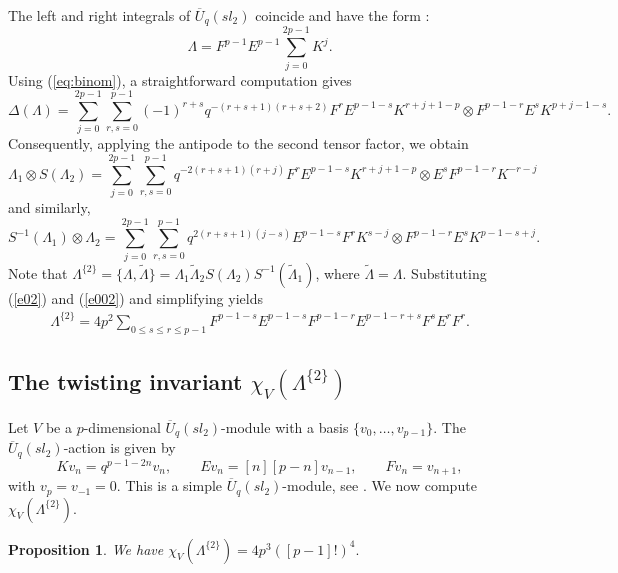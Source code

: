 \documentclass[11pt]{amsart}
\newtheorem{prop}[thm]{Proposition}
\numberwithin{equation}{section}
\begin{document}
The left and right integrals of $\overline{U}_q(sl_2)$ coincide and have the form \cite[Eq.(3.2)]{FGST}: $$\Lambda=F^{p-1}E^{p-1}\sum_{j=0}^{2p-1}K^{j}.$$
Using (\ref{eq:binom}),  a straightforward computation gives
\begin{equation}\Delta(\Lambda)=\sum_{j=0}^{2p-1}\sum_{r,s=0}^{p-1}(-1)^{r+s}q^{-(r+s+1)(r+s+2)}F^{r}E^{p-1-s}K^{r+j+1-p}\otimes F^{p-1-r}E^{s}K^{p+j-1-s}.\end{equation}
Consequently, applying the antipode to the second tensor factor, we obtain
\begin{equation}\label{e02}\Lambda_1\otimes S(\Lambda_2)=\sum_{j=0}^{2p-1}\sum_{r,s=0}^{p-1}q^{-2(r+s+1)(r+j)}F^{r}E^{p-1-s}K^{r+j+1-p}\otimes E^sF^{p-1-r}K^{-r-j}\end{equation}
and similarly,
\begin{equation}\label{e002}S^{-1}(\Lambda_1)\otimes \Lambda_2=\sum_{j=0}^{2p-1}\sum_{r,s=0}^{p-1}q^{2(r+s+1)(j-s)}E^{p-1-s}F^rK^{s-j}\otimes F^{p-1-r}E^sK^{p-1-s+j}.\end{equation}
Note that $\Lambda^{\{2\}}=\{\Lambda,\widetilde{\Lambda}\}=\Lambda_1\widetilde{\Lambda}_2S(\Lambda_2)S^{-1}(\widetilde{\Lambda}_1)$, where $\widetilde{\Lambda}=\Lambda$.
Substituting (\ref{e02}) and (\ref{e002}) and simplifying yields
\begin{align}\label{e6}
\Lambda^{\{2\}}=4p^2\sum_{0\leq s\leq r \leq p-1}F^{p-1-s}E^{p-1-s}F^{p-1-r}E^{p-1-r+s}F^sE^rF^r.
\end{align}

\subsection{The twisting invariant $\chi_V(\Lambda^{\{2\}})$}
Let $V$ be a $p$-dimensional $\overline{U}_q(sl_2)$-module with a basis $\{v_0,\dots,v_{p-1}\}$. The $\overline{U}_q(sl_2)$-action is given by
\[
K v_n = q^{p-1-2n} v_n,\qquad
E v_n = [n][p-n] v_{n-1},\qquad
F v_n = v_{n+1},
\]
with $v_p=v_{-1}=0$.  This is a simple $\overline{U}_q(sl_2)$-module, see \cite[Sec.3.2.1]{FGST}.
We now compute $\chi_V(\Lambda^{\{2\}})$.

\begin{prop}We have
$
\chi_V(\Lambda^{\{2\}}) = 4p^3 ([p-1]!)^4.
$
\end{prop}
\end{document}
